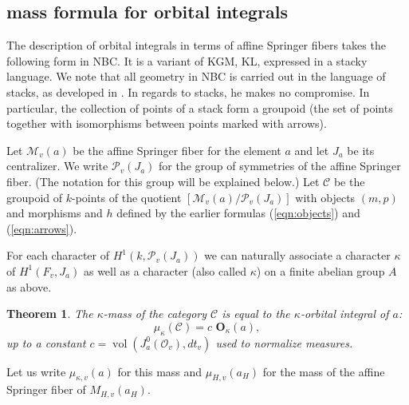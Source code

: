 \documentclass[brochure,english,12pt]{bourbaki}
\newtheorem{example}[equation]{Example}
\newtheorem{theorem}[equation]{Theorem}
\def\op#1{{\operatorname{#1}}}
\def\OO{{\mathbf O}}
\def\C{{\mathcal C}}
\def\M{{\mathcal M}}
\def\P{{\mathcal P}}
\def\O{{\mathcal O}}
\begin{document}


\subsection{mass formula for orbital integrals}

The description of orbital integrals in terms of affine Springer
fibers takes the following form in NBC.  It is a variant of KGM, KL,
expressed in a stacky language.  We note that all geometry in NBC is
carried out in the language of stacks, as developed in
\cite{LMB:2000}.  In regards to stacks, he makes no compromise.  In
particular, the collection of points of a stack form a groupoid (the
set of points together with isomorphisms between points marked with
arrows).

Let $\M_v(a)$ be the affine Springer fiber for the element $a$ and let
$J_a$ be its centralizer.  We write $\P_v(J_a)$ for the group of
symmetries of the affine Springer fiber.  (The notation for this group
will be explained below.)  Let $\C$ be the groupoid of $k$-points of
the quotient $[\M_v(a)/\P_v(J_a)]$ with objects $(m,p)$ and morphisms
and $h$ defined by the earlier formulas (\ref{eqn:objects}) and (\ref{eqn:arrows}).

For each character of $H^1(k,\P_v(J_a))$ we can naturally associate a
character $\kappa$ of $H^1(F_v,J_a)$ as well as a character (also
called $\kappa$) on a finite abelian group $A$ as above.

\begin{theorem}\label{lemma:orbital-mass}
The $\kappa$-mass of the category $\C$ is equal to the
$\kappa$-orbital integral of $a$:
\[
\mu_\kappa(\C) = c\,\, \OO_\kappa(a),
\]
up to a constant $c=\op{vol}(J^0_a(\O_v),dt_v)$ used to normalize measures.
\end{theorem}


Let us write $\mu_{\kappa,v}(a)$ for this mass and $\mu_{H,v}(a_H)$
for the mass of the affine Springer fiber of $M_{H,v}(a_H)$.
\end{document}
